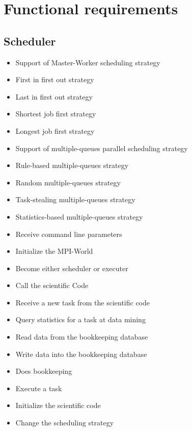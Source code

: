 {


\setcounter{func}{10}
\renewcommand{\labelitemi}{
	\ifnum \value{func}<10$/F 0\arabic{func} /$\addtocounter{func}{10}
	\else $/F \arabic{func} /$\addtocounter{func}{10}\fi
	}

\section{Functional requirements} 
	
	\subsection{Scheduler}
	
		\begin{itemize}
			\item Support of Master-Worker scheduling strategy
			\item First in first out strategy
			\item Last in first out strategy
			\item Shortest job first strategy
			\item Longest job first strategy 
			\item Support of multiple-queues parallel scheduling strategy
			\item Rule-based multiple-queues strategy
			\item Random multiple-queues strategy
			\item Task-stealing multiple-queues strategy
			\item Statistics-based multiple-queues strategy
			\item Receive command line parameters
			\item Initialize the MPI-World
			\item Become either scheduler or executer
			\item Call the scientific Code 
			\item Receive a new task from the scientific code
			\item Query statistics for a task at data mining
			\item Read data from the bookkeeping database
			\item Write data into the bookkeeping database
			\item Does bookkeeping
			\item Execute a task
			\item Initialize the scientific code
			\item Change the scheduling strategy
		\end{itemize}
	
}
